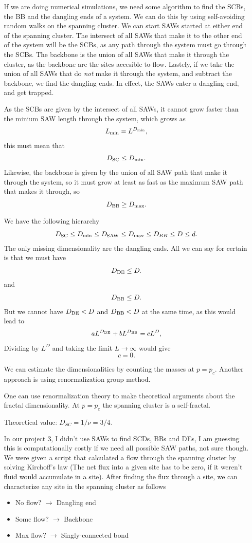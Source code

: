 \documentclass[a4paper, 11pt, notitlepage, english]{article}
\begin{document}
If we are doing numerical simulations, we need some algorithm to find the SCBs, the BB and the dangling ends of a system. We can do this by using self-avoiding random walks on the spanning cluster. We can start SAWs started at either end of the spanning cluster. The intersect of all SAWs that make it to the other end of the system will be the SCBs, as any path through the system must go through the SCBs. The backbone is the union of all SAWs that make it through the cluster, as the backbone are the sites accesible to flow. Lastely, if we take the union of all SAWs that do \emph{not} make it through the system, and subtract the backbone, we find the dangling ends. In effect, the SAWs enter a dangling end, and get trapped.

As the SCBs are given by the intersect of all SAWs, it cannot grow faster than the minium SAW length through the system, which grows as
$$L_{\rm min} = L^{D_{\rm min}},$$
this must mean that
$$D_{\rm SC} \leq D_{\rm min}.$$
Likewise, the backbone is given by the union of all SAW path that make it through the system, so it must grow at least as fast as the maximum SAW path that makes it through, so
$$D_{\rm BB} \ge D_{\rm max}.$$

We have the following hierarchy
$$D_{\rm SC} \leq D_{\rm min} \leq D_{\rm SAW} \leq D_{\rm max} \leq D_{BB} \leq D \leq d.$$
The only missing dimensionality are the dangling ends. All we can say for certain is that we must have
$$D_{\rm DE} \leq D.$$
and 
$$D_{\rm BB} \leq D.$$
But we cannot have $D_{\rm DE} < D$ and $D_{\rm BB} < D$ at the same time, as this would lead to
$$aL^{D_{\rm DE}} + bL^{D_{\rm BB}} = cL^D,$$
Dividing by $L^D$ and taking the limit $L \to \infty$ would give
$$c = 0.$$

We can estimate the dimensionalities by counting the masses at $p=p_c$. Another approach is using renormalization group method.

One can use renormalization theory to make theoretical arguments about the fractal dimensionality. At $p=p_c$ the spanning cluster is a self-fractal.

Theoretical value: $D_{SC} = 1/\nu = 3/4$.

In our project 3, I didn't use SAWs to find SCDs, BBs and DEs, I am guessing this is computationally costly if we need all possible SAW paths, not sure though. We were given a script that calculated a flow through the spanning cluster by solving Kirchoff's law (The net flux into a given site has to be zero, if it weren't fluid would accumulate in a site). After finding the flux through a site, we can characterize any site in the spanning cluster as follows
\begin{itemize}
	\item No flow? $\to$ Dangling end
	\item Some flow? $\to$ Backbone
	\item Max flow? $\to$ Singly-connected bond
\end{itemize}
\end{document}
